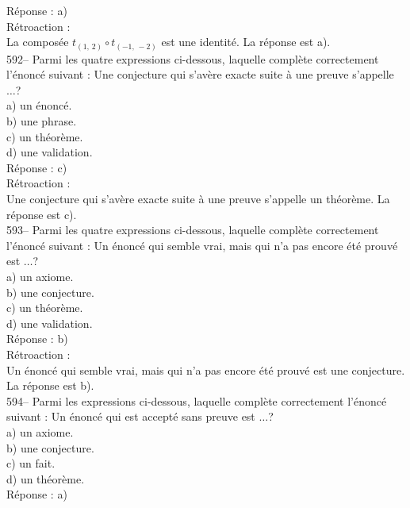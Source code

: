 ﻿\documentclass[letterpaper, 12pt]{article}
\begin{document}
R\'eponse : a) \\

R\'etroaction : \\
La compos\'ee $t_{\left(1,\,2\right) } \circ t_{\left(-1,\,-2\right) } $ est
une identit\'e.  La r\'eponse est a).\\


592--  Parmi les quatre expressions ci-dessous, laquelle compl\`ete
correctement l'\'enonc\'e suivant : \og Une conjecture qui s'av\`ere
exacte suite \`a une preuve s'appelle $\dots$\fg ?\\
a) un \'enonc\'e.\\
b) une phrase. \\
c) un th\'eor\`eme.\\
d) une validation.\\

R\'eponse : c)\\

R\'etroaction : \\
Une conjecture qui s'av\`ere exacte suite \`a une preuve s'appelle un
th\'eor\`eme.  La r\'eponse est c).\\

593-- Parmi les quatre expressions ci-dessous, laquelle compl\`ete
correctement l'\'enonc\'e suivant : \og Un \'enonc\'e qui semble
vrai, mais qui n'a pas encore \'et\'e prouv\'e est $\ldots$\fg ?\\
a) un axiome.\\
b) une conjecture.\\
c) un th\'eor\`eme.\\
d) une validation.\\

R\'eponse : b)\\

R\'etroaction : \\
Un \'enonc\'e qui semble vrai, mais qui n'a pas encore \'et\'e prouv\'e est
une conjecture.  La r\'eponse est b).\\

594-- Parmi les expressions ci-dessous, laquelle compl\`ete
correctement l'\'enonc\'e suivant : \og Un \'enonc\'e qui est
 accept\'e sans preuve est $\ldots$\fg ?\\
a) un axiome.\\
b) une conjecture.\\
c) un fait.\\
d) un th\'eor\`eme.\\

R\'eponse : a)\\
\end{document}
